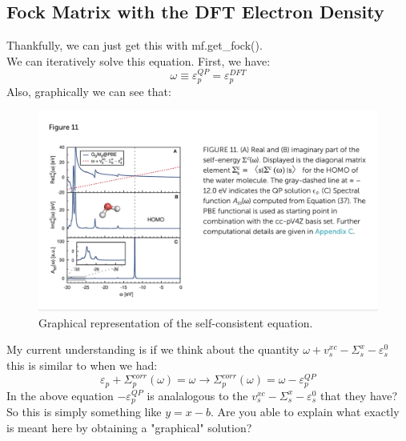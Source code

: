 \documentclass[12pt]{article}
\begin{document}
\subsection{Fock Matrix with the DFT Electron Density}
Thankfully, we can just get this with mf.get\_fock().\\
We can iteratively solve this equation. First, we have:
\begin{equation}
   \omega \equiv  \varepsilon_{p}^{QP} = \varepsilon_{p}^{DFT}
\end{equation}
\newpage
Also, graphically we can see that:
\begin{figure}[h]
    \centering
    \includegraphics[width=\textwidth]{water.png}
    \caption{Graphical representation of the self-consistent equation.}
    \label{fig:my_label}
\end{figure}
My current understanding is if we think about the quantity $\omega + v_{s}^{xc}- \Sigma _{s}^{x}- \varepsilon _{s}^{0}$ this is similar to when we had:
\begin{equation}
    \varepsilon _{p}+\Sigma _{p}^{corr}(\omega )=\omega \rightarrow \Sigma _{p}^{corr}(\omega ) = \omega -\varepsilon _{p}^{QP}
\end{equation}
In the above equation $-\varepsilon _{p}^{QP}$ is analalogous to the $v_{s}^{xc}- \Sigma _{s}^{x}- \varepsilon _{s}^{0}$ that they have?
So this is simply something like $y=x-b$. Are you able to explain what exactly is meant here by obtaining a "graphical" solution?
\end{document}
